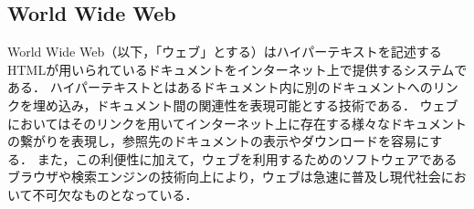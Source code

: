 \documentclass[journal]{IEEEtran}
\begin{document}
\subsection{World Wide Web}
World Wide Web（以下，「ウェブ」とする）はハイパーテキストを記述するHTMLが用いられているドキュメントをインターネット上で提供するシステムである．
ハイパーテキストとはあるドキュメント内に別のドキュメントへのリンクを埋め込み，ドキュメント間の関連性を表現可能とする技術である．
ウェブにおいてはそのリンクを用いてインターネット上に存在する様々なドキュメントの繋がりを表現し，参照先のドキュメントの表示やダウンロードを容易にする．
また，この利便性に加えて，ウェブを利用するためのソフトウェアであるブラウザや検索エンジンの技術向上により，ウェブは急速に普及し現代社会において不可欠なものとなっている．
\end{document}
